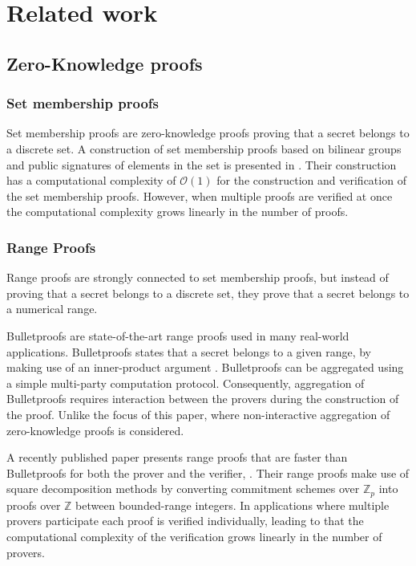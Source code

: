 \section*{Related work}

\subsection*{Zero-Knowledge proofs}

\subsubsection*{Set membership proofs}
Set membership proofs are zero-knowledge proofs proving that a secret belongs to a discrete  set. A construction of set membership proofs based on bilinear groups and public signatures of elements in the set is presented in \cite{RANGE-SET}. Their construction has a computational complexity of $\mathcal{O}(1)$ for the construction and verification of the set membership proofs. However, when multiple proofs are verified at once the computational complexity grows linearly in the number of proofs. 

\subsubsection*{Range Proofs}
Range proofs are strongly connected to set membership proofs, but instead of proving that a secret belongs to a discrete set, they prove that a secret belongs to a numerical range.

Bulletproofs are state-of-the-art range proofs used in many real-world applications. Bulletproofs states that a secret belongs to a given range, by making use of an inner-product argument \cite{bulletProofs_theory}. Bulletproofs can be aggregated using a simple multi-party computation protocol. Consequently, aggregation of Bulletproofs requires interaction between the provers during the construction of the proof. Unlike the focus of this paper, where non-interactive aggregation of zero-knowledge proofs is considered.

A recently published paper presents range proofs that are faster than Bulletproofs for both the prover and the verifier, \cite{improveBulletproofs}. Their range proofs make use of square decomposition methods by converting commitment schemes over $\mathds{Z}_p$ into proofs over $\mathds{Z}$ between bounded-range integers. In applications where multiple provers participate each proof is verified individually, leading to that the computational complexity of the verification grows linearly in the number of provers. 


